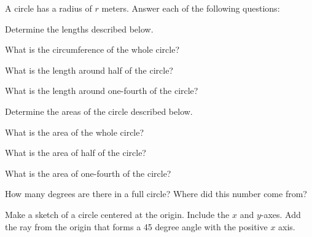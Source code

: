 
\begin{problem}
\item A circle has a radius of $r$ meters. Answer each of the
  following questions:
  \begin{subproblem}
  \item Determine the lengths described below.
    \begin{subsubproblem}
    \item What is the circumference of the whole circle?
      \vfill
    \item What is the length around half of the circle?
      \vfill
    \item What is the length around one-fourth of the circle?
      \vfill
    \end{subsubproblem}
  \item Determine the areas of the circle described below.
    \begin{subsubproblem}
    \item What is the area of the whole circle?
      \vfill
    \item What is the area of half of the circle?
      \vfill
    \item What is the area of one-fourth of the circle?
      \vfill
    \end{subsubproblem}
  \item How many degrees are there in a full circle? Where did this
    number come from?
    \vfill
  \item Make a sketch of a circle centered at the origin. Include the
    $x$ and $y$-axes. Add the ray from the origin that forms a 45
    degree angle with the positive $x$ axis.
    \vfill
    \vfill
  \end{subproblem}
\end{problem}



